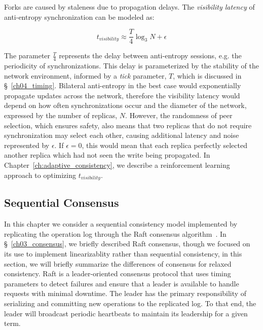 Forks are caused by staleness due to propagation delays.
The \emph{visibility latency} of anti-entropy synchronization can be modeled as:

\renewcommand{\baselinestretch}{1}
\begin{equation}
    t_{visibility} \approx \frac{T}{4} \log_3N + \epsilon
    \label{eq:anti_entropy_visibility_latency}
\end{equation}
\renewcommand{\baselinestretch}{2}

The parameter $\frac{T}{4}$ represents the delay between anti-entropy sessions, e.g. the periodicity of synchronizations.
This delay is parameterized by the stability of the network environment, informed by a \emph{tick} parameter, $T$, which is discussed in \S~\ref{ch04_timing}.
Bilateral anti-entropy in the best case would exponentially propagate updates across the network, therefore the visibility latency would depend on how often synchronizations occur and the diameter of the network, expressed by the number of replicas, $N$.
However, the randomness of peer selection, which ensures safety, also means that two replicas that do not require synchronization may select each other, causing additional latency and noise represented by $\epsilon$.
If $\epsilon=0$, this would mean that each replica perfectly selected another replica which had not seen the write being propagated.
In Chapter~\ref{ch:adaptive_consistency}, we describe a reinforcement learning approach to optimizing $t_{visibility}$.

\subsection{Sequential Consensus}
\label{ch04_consensus}

In this chapter we consider a sequential consistency model implemented by replicating the operation log through the Raft consensus algorithm~\cite{raft}.
In \S~\ref{ch03_consensus}, we briefly described Raft consensus, though we focused on its use to implement linearizablity rather than sequential consistency, in this section, we will briefly summarize the differences of consensus for relaxed consistency.
Raft is a leader-oriented consensus protocol that uses timing parameters to detect failures and ensure that a leader is available to handle requests with minimal downtime.
The leader has the primary responsibility of serializing and committing new operations to the replicated log.
To that end, the leader will broadcast periodic heartbeats to maintain its leadership for a given term.

